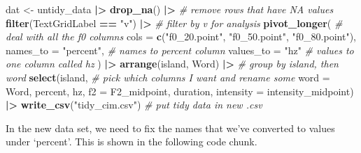 \documentclass[
  ,man,floatsintext]{apa6}
\newenvironment{Shaded}{\begin{snugshade}}{\end{snugshade}}
\newcommand{\AttributeTok}[1]{\textcolor[rgb]{0.13,0.29,0.53}{#1}}
\newcommand{\CommentTok}[1]{\textcolor[rgb]{0.56,0.35,0.01}{\textit{#1}}}
\newcommand{\FunctionTok}[1]{\textcolor[rgb]{0.13,0.29,0.53}{\textbf{#1}}}
\newcommand{\NormalTok}[1]{#1}
\newcommand{\OtherTok}[1]{\textcolor[rgb]{0.56,0.35,0.01}{#1}}
\newcommand{\SpecialCharTok}[1]{\textcolor[rgb]{0.81,0.36,0.00}{\textbf{#1}}}
\newcommand{\StringTok}[1]{\textcolor[rgb]{0.31,0.60,0.02}{#1}}
\begin{document}
\begin{Shaded}
\begin{Highlighting}[]
\NormalTok{dat }\OtherTok{\textless{}{-}}\NormalTok{ untidy\_data }\SpecialCharTok{|\textgreater{}}
  \FunctionTok{drop\_na}\NormalTok{() }\SpecialCharTok{|\textgreater{}}   \CommentTok{\# remove rows that have NA values}
  \FunctionTok{filter}\NormalTok{(TextGridLabel }\SpecialCharTok{==} \StringTok{"v"}\NormalTok{) }\SpecialCharTok{|\textgreater{}}   \CommentTok{\# filter by \textquotesingle{}v\textquotesingle{} for analysis}
  \FunctionTok{pivot\_longer}\NormalTok{(      }\CommentTok{\# deal with all the f0 columns}
    \AttributeTok{cols =} \FunctionTok{c}\NormalTok{(}\StringTok{"f0\_20.point"}\NormalTok{, }
             \StringTok{"f0\_50.point"}\NormalTok{, }
             \StringTok{"f0\_80.point"}\NormalTok{),}
    \AttributeTok{names\_to =} \StringTok{"percent"}\NormalTok{,    }\CommentTok{\# names to \textquotesingle{}percent\textquotesingle{} column}
    \AttributeTok{values\_to =} \StringTok{"hz"}      \CommentTok{\# values to one column called \textquotesingle{}hz\textquotesingle{}}
\NormalTok{  ) }\SpecialCharTok{|\textgreater{}}
  \FunctionTok{arrange}\NormalTok{(island, Word) }\SpecialCharTok{|\textgreater{}}   \CommentTok{\# group by \textquotesingle{}island\textquotesingle{}, then \textquotesingle{}word\textquotesingle{}}
  \FunctionTok{select}\NormalTok{(island,      }\CommentTok{\# pick which columns I want and rename some}
         \AttributeTok{word =}\NormalTok{ Word, }
\NormalTok{         percent, hz, }\AttributeTok{f2 =}\NormalTok{ F2\_midpoint, duration, }
         \AttributeTok{intensity =}\NormalTok{ intensity\_midpoint) }\SpecialCharTok{|\textgreater{}}
  \FunctionTok{write\_csv}\NormalTok{(}\StringTok{"tidy\_cim.csv"}\NormalTok{)    }\CommentTok{\# put tidy data in new .csv}
\end{Highlighting}
\end{Shaded}

In the new data set, we need to fix the names that we've converted to values under `percent'. This is shown in the following code chunk.

\begin{Shaded}
\end{Shaded}
\end{document}
